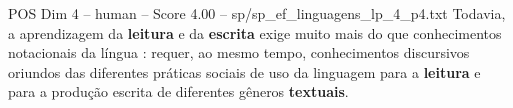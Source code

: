 \begin{textsample}{POS Dim 4 – human – Score 4.00 – sp/sp\_ef\_linguagens\_lp\_4\_p4.txt}  \label{ex:f4_pos_016}
Todavia, a aprendizagem da \textbf{leitura} e da \textbf{escrita} exige muito mais do que conhecimentos notacionais da língua : requer, ao mesmo tempo, conhecimentos discursivos oriundos das diferentes práticas sociais de uso da linguagem para a \textbf{leitura} e para a produção escrita de diferentes gêneros \textbf{textuais}.

\end{textsample}
